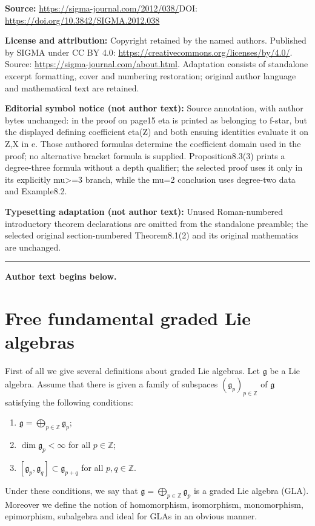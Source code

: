 \documentclass[11pt]{article}
\numberwithin{equation}{section}
\numberwithin{theorem}{section}
\numberwithin{proposition}{section}
\numberwithin{lemma}{section}
\numberwithin{corollary}{section}
\numberwithin{definition}{section}
\numberwithin{example}{section}
\numberwithin{remark}{section}
\numberwithin{note}{section}
\newcommand{\gla}[1]{\mathfrak#1=\bigoplus\limits_{p\in\mathbb Z}\mathfrak#1_p} \renewcommand{\labelenumi}{{\rm (\arabic{enumi})}}
\newcounter{theoremI}
\begin{document}
\noindent\textbf{Source:} \url{https://sigma-journal.com/2012/038/}\quad DOI: \url{https://doi.org/10.3842/SIGMA.2012.038}\par
\noindent\textbf{License and attribution:} Copyright retained by the named authors. Published by SIGMA under CC BY 4.0: \url{https://creativecommons.org/licenses/by/4.0/}. Source: \url{https://sigma-journal.com/about.html}. Adaptation consists of standalone excerpt formatting, cover and numbering restoration; original author language and mathematical text are retained.\par
\noindent\textbf{Editorial symbol notice (not author text):} Source annotation, with author bytes unchanged: in the proof on page15 eta is printed as belonging to f-star, but the displayed defining coefficient eta(Z) and both ensuing identities evaluate it on Z,X in e. Those authored formulas determine the coefficient domain used in the proof; no alternative bracket formula is supplied. Proposition8.3(3) prints a degree-three formula without a depth qualifier; the selected proof uses it only in its explicitly mu>=\allowbreak{}3 branch, while the mu=\allowbreak{}2 conclusion uses degree-two data and Example8.2.\par
\noindent\textbf{Typesetting adaptation (not author text):} Unused Roman-numbered introductory theorem declarations are omitted from the standalone preamble; the selected original section-numbered Theorem8.1(2) and its original mathematics are unchanged.\par
\medskip\hrule\medskip\noindent\textbf{Author text begins below.}\par
\setcounter{section}{1}
\setcounter{subsection}{0}
\setcounter{subsubsection}{0}
\setcounter{theoremI}{2}
\setcounter{equation}{0}
\section{Free fundamental graded Lie algebras}\label{section2}

First of all we give several def\/initions about graded Lie algebras.
Let $\mathfrak g$ be a Lie algebra. Assume that there is given a family of
subspaces $(\mathfrak g_p)_{p\in\mathbb Z}$ of $\mathfrak g$ satisfying
the following conditions:
\begin{enumerate}\itemsep=0pt
\renewcommand{\labelenumi}{$(\roman{enumi})$}
\item $\gla g$;
\item $\dim \mathfrak g_p<\infty$ for all $p\in\mathbb Z$;
\item $[\mathfrak g_p,\mathfrak g_q]\subset \mathfrak g_{p+q}$
for all $p,q\in\mathbb Z$.
\end{enumerate}
Under these conditions, we say that $\gla g$ is a graded Lie algebra (GLA).
Moreover we def\/ine the notion of homomorphism, isomorphism, monomorphism,
epimorphism, subalgebra and
ideal for GLAs in an obvious manner.
\end{document}
